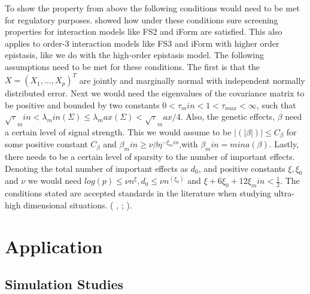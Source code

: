 \documentclass[11pt,]{book}
\theoremstyle{definition}
\theoremstyle{definition}
\theoremstyle{remark}
\begin{document}
To show the property from above the following conditions would need to
be met for regulatory purposes. \cite{hao2014interaction} showed how
under these conditions sure screening properties for interaction models
like FS2 and iForm are satisfied. This also applies to order-3
interaction models like FS3 and iForm with higher order epistasis, like
we do with the high-order epistasis model. The following assumptions
need to be met for these conditions. The first is that the
\(X=(X_1,\dots,X_p)^T\) are jointly and marginally normal with
independent normally distributed error. Next we would need the
eigenvalues of the covariance matrix to be positive and bounded by two
constants \(0 < \tau_min < 1 < \tau_{max} < \infty\), such that
\(\sqrt{\tau}_min < \lambda_min (\Sigma)≤\lambda_max (\Sigma)< \sqrt{\tau}_max/4\).
Also, the genetic effects, \(\beta\) need a certain level of signal
strength. This we would assume to be \(|(|\beta|)| ≤ C_\beta\) for some
positive constant \(C_\beta\) and
\(\beta_min ≥ \nu\beta \eta^{-\xi_min}\),with \(\beta_min=mina(\beta)\).
Lastly, there needs to be a certain level of sparsity to the number of
important effects. Denoting the total number of important effects as
\(d_0\), and positive constants \(\xi,\xi_0\) and \(\nu\) we would need
\(log(p) ≤ \nu n^\xi,d_0 ≤ \nu n^(\xi_0)\) and
\(\xi+6\xi_0+12\xi_min \lt \frac{1}{2}\). The conditions stated are
accepted standards in the literature when studying ultra-high
dimensional situations. (\cite{hao2014interaction} , \cite{fan2008sure};
\cite{sun2013genome}).

\section{Application}\label{application-1}

\subsection{Simulation Studies}\label{simulation-studies}
\end{document}
